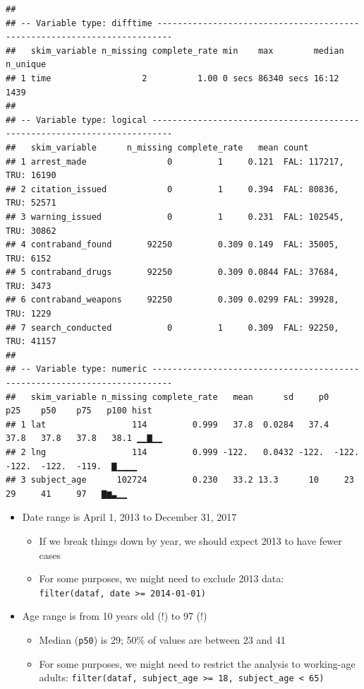 \documentclass[
]{article}
\providecommand{\tightlist}{%
  \setlength{\itemsep}{0pt}\setlength{\parskip}{0pt}}
\begin{document}
\begin{verbatim}
## 
## -- Variable type: difftime -------------------------------------------------------------------------
##   skim_variable n_missing complete_rate min    max        median n_unique
## 1 time                  2          1.00 0 secs 86340 secs 16:12      1439
## 
## -- Variable type: logical --------------------------------------------------------------------------
##   skim_variable      n_missing complete_rate   mean count                  
## 1 arrest_made                0         1     0.121  FAL: 117217, TRU: 16190
## 2 citation_issued            0         1     0.394  FAL: 80836, TRU: 52571 
## 3 warning_issued             0         1     0.231  FAL: 102545, TRU: 30862
## 4 contraband_found       92250         0.309 0.149  FAL: 35005, TRU: 6152  
## 5 contraband_drugs       92250         0.309 0.0844 FAL: 37684, TRU: 3473  
## 6 contraband_weapons     92250         0.309 0.0299 FAL: 39928, TRU: 1229  
## 7 search_conducted           0         1     0.309  FAL: 92250, TRU: 41157 
## 
## -- Variable type: numeric --------------------------------------------------------------------------
##   skim_variable n_missing complete_rate   mean      sd     p0    p25    p50    p75   p100 hist 
## 1 lat                 114         0.999   37.8  0.0284   37.4   37.8   37.8   37.8   38.1 ▁▁▇▁▁
## 2 lng                 114         0.999 -122.   0.0432 -122.  -122.  -122.  -122.  -119.  ▇▁▁▁▁
## 3 subject_age      102724         0.230   33.2 13.3      10     23     29     41     97   ▇▆▃▁▁
\end{verbatim}

\begin{itemize}
\tightlist
\item
  Date range is April 1, 2013 to December 31, 2017

  \begin{itemize}
  \tightlist
  \item
    If we break things down by year, we should expect 2013 to have fewer cases
  \item
    For some purposes, we might need to exclude 2013 data: \texttt{filter(dataf,\ date\ \textgreater{}=\ \textquotesingle{}2014-01-01\textquotesingle{})}
  \end{itemize}
\item
  Age range is from 10 years old (!) to 97 (!)

  \begin{itemize}
  \tightlist
  \item
    Median (\texttt{p50}) is 29; 50\% of values are between 23 and 41
  \item
    For some purposes, we might need to restrict the analysis to working-age adults: \texttt{filter(dataf,\ subject\_age\ \textgreater{}=\ 18,\ subject\_age\ \textless{}\ 65)}
  \end{itemize}
\end{itemize}
\end{document}
